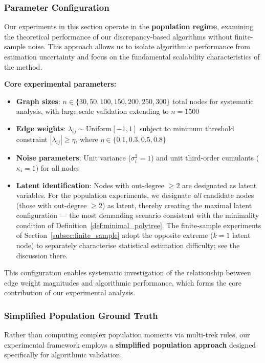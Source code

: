 \documentclass[11pt,a4paper]{article}
\numberwithin{equation}{section}
\begin{document}
\subsubsection{Parameter Configuration}

Our experiments in this section operate in the \textbf{population regime}, examining the theoretical performance of our discrepancy-based algorithms without finite-sample noise. This approach allows us to isolate algorithmic performance from estimation uncertainty and focus on the fundamental scalability characteristics of the method.

\textbf{Core experimental parameters:}
\begin{itemize}
\item \textbf{Graph sizes}: $n \in \{30, 50, 100, 150, 200, 250, 300\}$ total nodes for systematic analysis, with large-scale validation extending to $n = 1500$
\item \textbf{Edge weights}: $\lambda_{ij} \sim \text{Uniform}[-1,1]$ subject to minimum threshold constraint $|\lambda_{ij}| \geq \eta$, where $\eta \in \{0.1, 0.3, 0.5, 0.8\}$
\item \textbf{Noise parameters}: Unit variance ($\sigma_i^2 = 1$) and unit third-order cumulants ($\kappa_i = 1$) for all nodes
\item \textbf{Latent identification}: Nodes with out-degree $\geq 2$ are
designated as latent variables.  For the population experiments, we designate
\emph{all} candidate nodes (those with out-degree $\geq 2$) as latent, thereby
creating the maximal latent configuration --- the most demanding scenario
consistent with the minimality condition of Definition~\ref{def:minimal_polytree}.
The finite-sample experiments of Section~\ref{subsec:finite_sample} adopt
the opposite extreme ($k = 1$ latent node) to separately characterise
statistical estimation difficulty; see the discussion there.
\end{itemize}

This configuration enables systematic investigation of the relationship between edge weight magnitudes and algorithmic performance, which forms the core contribution of our experimental analysis.

\subsubsection{Simplified Population Ground Truth}

Rather than computing complex population moments via multi-trek rules, our experimental framework employs a \textbf{simplified population approach} designed specifically for algorithmic validation:
\end{document}
